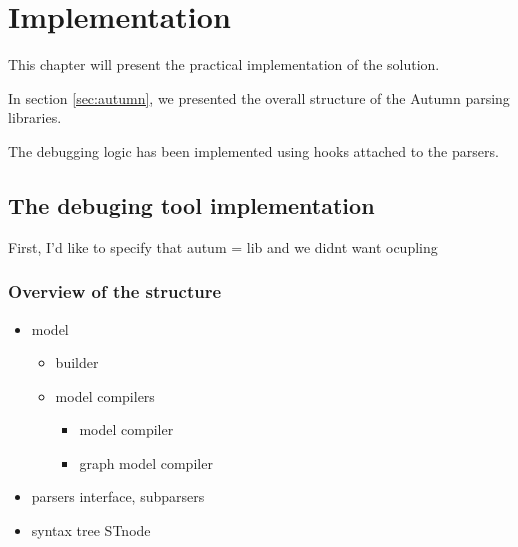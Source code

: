 %
\chapter{Implementation}
%
	This chapter will present the practical implementation of the solution.

	In section \ref{sec:autumn}, we presented the overall structure of the Autumn parsing libraries. 

	The debugging logic has been implemented using hooks attached to the parsers.

\section{The debuging tool implementation}
%
	
	First, I'd like to specify that autum = lib and we didnt want ocupling

	\subsection{Overview of the structure}
%

	\begin{itemize}
		\item model
		\begin{itemize}
			\item builder
			\item model compilers
			\begin{itemize}
				\item model compiler
				\item graph model compiler
			\end{itemize}
		\end{itemize}
		\item parsers interface, subparsers
		\item syntax tree STnode
	\end{itemize}

